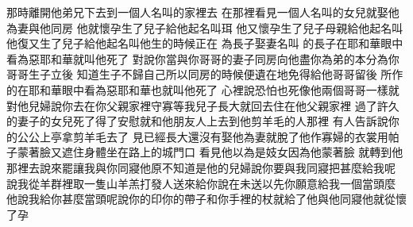 \bchapter%
那時離開他弟兄下去\chientien 到一個人名叫的家裡去\chuan 
{}在那裡看見一個人名叫的女兒\chientien 就娶他為妻\chientien 與他同房\chientien 
{}他就懷孕生了兒子\chientien{}給他起名叫珥\chuan 
{}他又懷孕生了兒子\chientien 母親給他起名叫\chuan 
{}他復又生了兒子\chientien 給他起名叫\yuentien 他生的時候\chientien{}正在\chuan 
{}為長子娶妻\chientien 名叫\chuan 
{}的長子在耶和華眼中看為惡\chientien 耶和華就叫他死了\chuan 
{}對說\chientien 你當與你哥哥的妻子同房\chientien 向他盡你為弟的本分\chientien 為你哥哥生子立後\chuan 
{}知道生子不歸自己\chientien 所以同房的時候\chientien 便遺在地\chientien 免得給他哥哥留後\chuan 
{}所作的\chientien 在耶和華眼中看為惡\chientien 耶和華也就叫他死了\chuan 
{}心裡說\chientien 恐怕也死\chientien 像他兩個哥哥一樣\chientien 就對他兒婦說\chientien 你去\chientien 在你父親家裡守寡\chientien 等我兒子長大\yuentien{}就回去住在他父親家裡\chuan\Chuan
{}過了許久\chientien{}的妻子的女兒死了\chientien{}得了安慰\chientien 就和他朋友人上去\chientien 到他剪羊毛的人那裡\chuan 
{}有人告訴說\chientien 你的公公上亭拿剪羊毛去了\chuan 
{}見已經長大\chientien 還沒有娶他為妻\chientien 就脫了他作寡婦的衣裳\chientien 用帕子蒙著臉\chientien 又遮住身體\chientien 坐在路上的城門口\chuan 
{}看見他\chientien 以為是妓女\chientien 因為他蒙著臉\chuan 
{}就轉到他那裡去說\chientien 來罷\chientien 讓我與你同寢\yuentien 他原不知道是他的兒婦\chuan{}說\chientien 你要與我同寢\chientien 把甚麼給我呢\chuan 
{}說\chientien 我從羊群裡取一隻山羊羔打發人送來給你\yuentien{}說\chientien 在未送以先\chientien 你願意給我一個當頭麼\chuan 
{}他說\chientien 我給你甚麼當頭呢\chientien{}說\chientien 你的印\chientien 你的帶子\chientien 和你手裡的杖\chuan{}就給了他\chientien 與他同寢\yuentien 他就從懷了孕\chuan 
